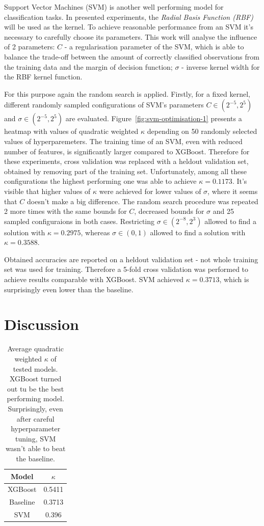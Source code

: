 \documentclass[fleqn,10pt]{SelfArx} %
\begin{document}
Support Vector Machines (SVM) is another well performing model for classification tasks.
In presented experiments, the \textit{Radial Basis Function (RBF)} will be used as the kernel.
To achieve reasonable performance from an SVM it's necessary to carefully choose its parameters.
This work will analyse the influence of 2 parameters: $C$ - a regularisation parameter of the SVM, which is able to balance the trade-off between the amount of correctly classified observations from the training data and the margin of decision function;
$\sigma$ - inverse kernel width for the RBF kernel function.

For this purpose again the random search is applied.
Firstly, for a fixed kernel, different randomly sampled configurations of SVM's parameters $C \in (2^{-5}, 2^5)$ and $\sigma \in (2^{-5}, 2^5)$ are evaluated.
Figure~\ref{fig:svm-optimisation-1} presents a heatmap with values of quadratic weighted $\kappa$ depending on 50 randomly selected values of hyperparemeters.
The training time of an SVM, even with reduced number of features, is significantly larger compared to XGBoost.
Therefore for these experiments, cross validation was replaced with a heldout validation set, obtained by removing part of the training set.
Unfortunately, among all these configurations the highest performing one was able to achieve $\kappa = 0.1173$.
It's visible that higher values of $\kappa$ were achieved for lower values of $\sigma$, where it seems that $C$ doesn't make a big difference.
The random search procedure was repeated 2 more times with the same bounds for $C$, decreased bounds for $\sigma$ and 25 sampled configuraions in both cases.
Restricting $\sigma \in (2^{-8}, 2^3)$ allowed to find a solution with $\kappa = 0.2975$, whereas $\sigma \in (0, 1)$ allowed to find a solution with $\kappa = 0.3588$.

Obtained accuracies are reported on a heldout validation set - not whole training set was used for training.
Therefore a 5-fold cross validation was performed to achieve results comparable with XGBoost.
SVM achieved $\kappa = 0.3713$, which is surprisingly even lower than the baseline.


\section{Discussion}

\begin{table}
    \caption{Average quadratic weighted $\kappa$ of tested models.
    XGBoost turned out tu be the best performing model.
    Surprisingly, even after careful hyperparameter tuning, SVM wasn't able to beat the baseline.}
    \centering
    \begin{tabular}{c|c}
        Model & $\kappa$ \\
        \hline
        XGBoost & 0.5411 \\
        Baseline & 0.3713 \\
        SVM & 0.396 \\
    \end{tabular}
    \label{tab:model-results}
\end{table}
\end{document}
